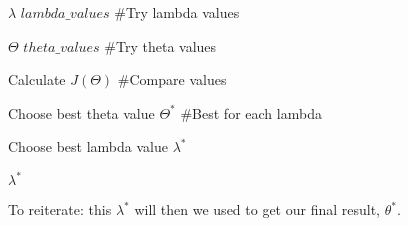         \begin{codebox}
                       
                \li \For $\lambda$ \In $lambda\_values$        
                \qquad\quad\#Try lambda values
                
                \li     \Do \For $\Theta$ \In $theta\_values$  
                \qquad\quad\#Try theta values    
                            \Do

                                \li Calculate $J(\Theta)$    
                                \qquad\qquad\qquad\#Compare values
                            \End
                        
                        \li Choose best theta value $\Theta^*$ 
                        \quad\#Best for each lambda

                        \End
                \li Choose best lambda value $\lambda^*$
                \li
                    
                \li \Return $\lambda^*$
        \end{codebox}
        
    To reiterate: this $\lambda^*$ will then we used to get our final result, $\theta^*$.